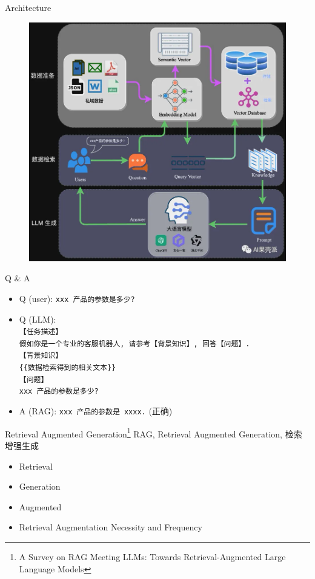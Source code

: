 \documentclass{beamer}
\begin{document}
\begin{frame}{Architecture}
    \begin{figure}[c]
        \centering
        \includegraphics[height=.75\textheight]{pic/1.png}
    \end{figure}
\end{frame}

\begin{frame}{Q \& A}
    \begin{itemize}
        \item Q (user): {\tt xxx 产品的参数是多少?}
        \item Q (LLM): {\tt \\
            【任务描述】\\
            假如你是一个专业的客服机器人, 请参考【背景知识】, 回答【问题】. \\
            【背景知识】\\
            \{\{数据检索得到的相关文本\}\} \\
            【问题】\\
            xxx 产品的参数是多少?
        }
        \item A (RAG): {\tt xxx 产品的参数是 xxxx.} (正确)
    \end{itemize}
\end{frame}

\begin{frame}{Retrieval Augmented Generation\footnote{A Survey on RAG Meeting LLMs: Towards Retrieval-Augmented Large Language Models}}
    RAG, Retrieval Augmented Generation, 检索增强生成
    \begin{itemize}
        \item Retrieval 
        \item Generation
        \item Augmented
        \item Retrieval Augmentation Necessity and Frequency
    \end{itemize}
\end{frame}
\end{document}
